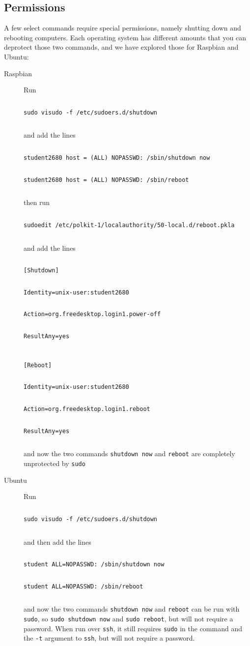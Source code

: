 \documentclass[11pt]{article}
\newcommand{\cmdline}[1]{\vspace{.2em} $\:$\\ \begin{minipage}{\dimexpr\textwidth-2cm}
\texttt{#1}
\end{minipage} $\:$\\ \vspace{-.2em} }
\begin{document}
\subsection{Permissions}
A few select commands require special permissions, namely shutting down and rebooting computers. Each operating system has different amounts that you can deprotect those two commands, and we have explored those for Raspbian and Ubuntu:
\begin{description}
\item[Raspbian] Run 

\cmdline{sudo visudo -f /etc/sudoers.d/shutdown}

and add the lines

\cmdline{student2680 host = (ALL) NOPASSWD: /sbin/shutdown now}
\cmdline{student2680 host = (ALL) NOPASSWD: /sbin/reboot}

then run

\cmdline{sudoedit /etc/polkit-1/localauthority/50-local.d/reboot.pkla}

and add the lines

\cmdline{[Shutdown]}
\cmdline{Identity=unix-user:student2680}
\cmdline{Action=org.freedesktop.login1.power-off}
\cmdline{ResultAny=yes}

\cmdline{[Reboot]}
\cmdline{Identity=unix-user:student2680}
\cmdline{Action=org.freedesktop.login1.reboot}
\cmdline{ResultAny=yes}

and now the two commands \texttt{shutdown now} and \texttt{reboot} are completely unprotected by \texttt{sudo}
\item[Ubuntu] Run

\cmdline{sudo visudo -f /etc/sudoers.d/shutdown}

and then add the lines

\cmdline{student ALL=NOPASSWD: /sbin/shutdown now}
\cmdline{student ALL=NOPASSWD: /sbin/reboot}

and now the two commands \texttt{shutdown now} and \texttt{reboot} can be run with \texttt{sudo}, so \texttt{sudo shutdown now} and \texttt{sudo reboot}, but will not require a password. When run over \texttt{ssh}, it still requires \texttt{sudo} in the command and the \texttt{-t} argument to \texttt{ssh}, but will not require a password.
\end{description}
\end{document}
